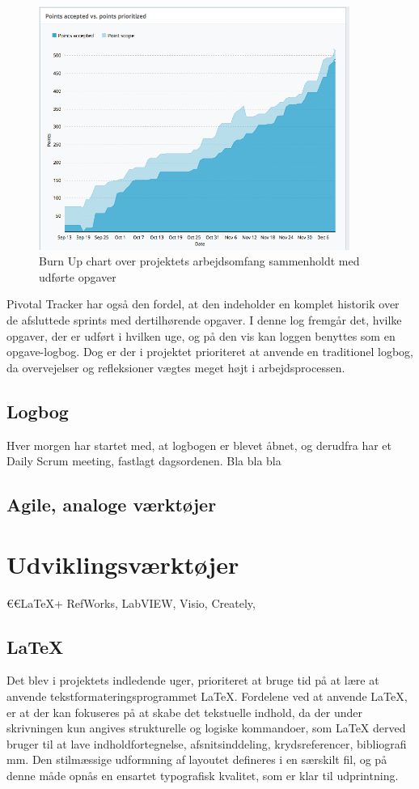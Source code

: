 	\begin{figure}[htb]
	\centering
	\includegraphics[width=4in]{burnup}
	\caption{Burn Up chart over projektets arbejdsomfang sammenholdt med udførte opgaver}
	\label{fig:burnup}	
	\end{figure}
	    	
	Pivotal Tracker har også den fordel, at den indeholder en komplet historik over de afsluttede sprints med dertilhørende opgaver. I denne log fremgår det, hvilke opgaver, der er udført i hvilken uge, og på den vis kan loggen benyttes som en opgave-logbog. Dog er der i projektet prioriteret at anvende en traditionel logbog, da overvejelser og refleksioner vægtes meget højt i arbejdsprocessen.	
	
	\subsection{Logbog}
	Hver morgen har startet med, at logbogen er blevet åbnet, og derudfra har et Daily Scrum meeting, fastlagt dagsordenen. Bla bla bla
		
	
	\subsection{Agile, analoge værktøjer}
	

\section{Udviklingsværktøjer}
	€€LaTeX+ RefWorks, LabVIEW, Visio, Creately, 

	\subsection{\LaTeX}
Det blev i projektets indledende uger, prioriteret at bruge tid på at lære at anvende tekstformateringsprogrammet \LaTeX. Fordelene ved at anvende LaTeX, er at der kan fokuseres på at skabe det tekstuelle indhold, da der under skrivningen kun angives strukturelle og logiske kommandoer, som LaTeX derved bruger til at lave indholdfortegnelse, afsnitsinddeling, krydsreferencer, bibliografi mm. Den stilmæssige udformning af layoutet defineres i en særskilt fil, og på denne måde opnås en ensartet typografisk kvalitet, som er klar til udprintning.   
